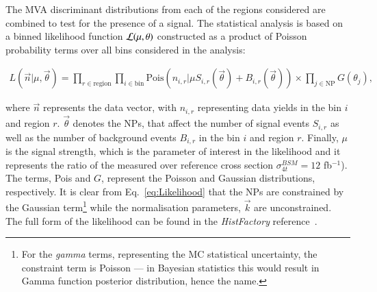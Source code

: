 %
The MVA discriminant distributions from each of the regions considered are combined to test for the presence of a signal.
The statistical analysis is based on a binned likelihood function ${\cal L}(\mu,\theta)$ constructed as
a product of Poisson probability terms over all bins considered in the analysis:

\begin{eqnarray}
    L\left(\vec{n}|\mu, \vec{\theta}\right) = \prod_{r \in \text{region}}\prod_{i\in \text{bin}} \text{Pois}\left(n_{i,r}|\mu S_{i,r}(\vec{\theta}) + B_{i,r}(\vec{\theta})\right)\times\prod_{j\in \text{NP}}G\left(\theta_j\right),
\label{eq:Likelihood}
\end{eqnarray}

\noindent where $\vec{n}$ represents the data vector, with $n_{i,r}$ representing data yields in the bin $i$ and region $r$.
$\vec{\theta}$ denotes the NPs, that affect the number of signal events $S_{i,r}$ as well as the number of background events $B_{i,r}$ in the bin $i$ and region $r$. Finally, $\mu$ is the signal strength, which is the parameter of interest in the likelihood and it represents the ratio of the measured over reference cross section $\sigma_{4t}^{BSM}=12$ fb$^{-1}$). The terms, Pois and $G$, represent the Poisson and Gaussian distributions, respectively. It is clear from Eq.~\ref{eq:Likelihood} that the NPs are constrained by the Gaussian term\footnote{For the \emph{gamma} terms, representing the MC statistical uncertainty, the constraint term is Poisson --- in Bayesian statistics this would result in Gamma function posterior distribution, hence the name.} while the normalisation parameters, $\vec{k}$ are unconstrained. The full form of the likelihood can be found in the \emph{HistFactory} reference~\cite{Cranmer:1456844}.

